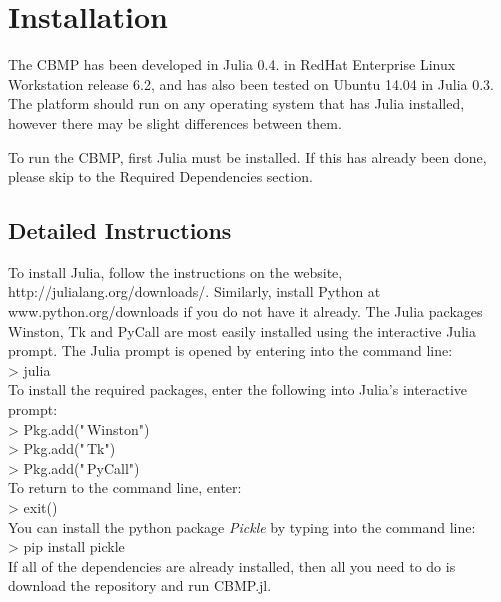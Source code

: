 \documentclass[12pt]{article}
\begin{document}
\section{Installation}
The CBMP has been developed in Julia 0.4. in RedHat Enterprise Linux 
Workstation release 6.2, and has also been tested on Ubuntu 14.04 in 
Julia 0.3. The platform should run on any operating system 
that has Julia installed, however there may be slight differences 
between them.

To run the CBMP, first Julia must be installed. If this has already been 
done, please skip to the Required Dependencies section.

\subsection{Detailed Instructions}
To install Julia, follow the instructions on the website, 
http://julialang.org/downloads/. Similarly,
install Python at www.python.org/downloads if you do not have it already. 
The Julia packages Winston, Tk and PyCall are most easily installed 
using the interactive Julia prompt. The Julia prompt is opened by entering
into the command line: \\

{\fontsize{11pt}{11pt} \ttfamily 
> julia} \\

To install the required packages, enter the following into Julia's interactive prompt: \\

{\fontsize{11pt}{11pt} \ttfamily 
> Pkg.add("\,Winston") \\

> Pkg.add("\,Tk") \\

> Pkg.add("\,PyCall")} \\ 

To return to the command line, enter: \\

{\fontsize{11pt}{11pt} \ttfamily 
> exit()} \\

You can install the python package {\itshape Pickle} by typing into the command line: \\

{\fontsize{11pt}{11pt} \ttfamily 
> pip install pickle} \\

If all of the dependencies are already installed, then all you need to 
do is download the repository and run CBMP.jl.
\end{document}
